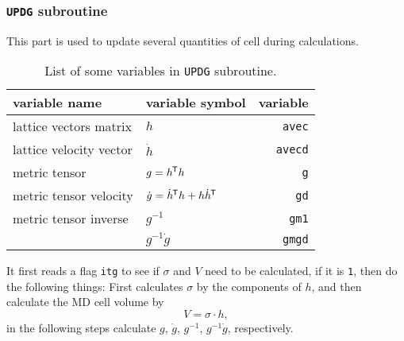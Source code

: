 
\subsubsection{\texttt{UPDG} subroutine}

This part is used to update several quantities of cell during calculations.

\begin{table}[htbp]
	\centering
	\caption{List of some variables in \texttt{UPDG} subroutine.}
	\begin{tabular}{@{}llr@{}}
		\toprule
		variable name           & variable symbol                                 & variable       \\
		\midrule
		lattice vectors matrix  & $h$                                             & \texttt{avec}  \\
		lattice velocity vector & $\dot{h}$                                       & \texttt{avecd} \\
		metric tensor           & $g = h ^{\mkern-1.5mu\mathsf{T}} h$                                 & \texttt{g}     \\
		metric tensor velocity  & $\dot{g} = \dot{ h }^{\mkern-1.5mu\mathsf{T}} h + h \dot{ h }^{\mkern-1.5mu\mathsf{T}}$ & \texttt{gd}    \\
		metric tensor inverse   & $g^{-1}$                                        & \texttt{gm1}   \\
		                        & $g^{-1} \dot{g}$                                & \texttt{gmgd}  \\
		\bottomrule
	\end{tabular}%
	\label{tab:updg}%
\end{table}%


It first reads a flag \texttt{itg} to see if $\sigma$ and $V$ need to be calculated,
if it is \texttt{1}, then do the following things:
First calculates $\sigma$ by the components of $h$, and then calculate the
MD cell volume by
\begin{equation}
	V = \sigma \cdot h,
\end{equation}
in the following steps calculate $g$, $\dot{ g }$, $g^{-1}$, $g^{-1}\dot{g}$, respectively.

